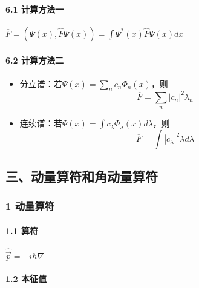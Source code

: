 \documentclass[UTF8,twocolumn]{ctexart}
\providecommand{\tightlist}{%
  \setlength{\itemsep}{0pt}\setlength{\parskip}{0pt}}
\let\oldparagraph\paragraph
\renewcommand{\paragraph}[1]{\oldparagraph{#1}\mbox{}}
\begin{document}
\hypertarget{ux8ba1ux7b97ux65b9ux6cd5ux4e00}{%
\paragraph{ 6.1 计算方法一}\label{ux8ba1ux7b97ux65b9ux6cd5ux4e00}}

\begin{center}
\(\overline{F}=(\Psi(x),\hat{F}\Psi(x))=\int\Psi^*(x)\hat{F}\Psi(x)dx\)
\end{center}

\hypertarget{ux8ba1ux7b97ux65b9ux6cd5ux4e8c}{%
\paragraph{ 6.2 计算方法二}\label{ux8ba1ux7b97ux65b9ux6cd5ux4e8c}}

\begin{itemize}
\tightlist
\item
  分立谱：若\(\Psi(x)=\sum_nc_n\Phi_n(x)\)，则
  \[\overline{F}=\sum_n|c_n|^2\lambda_n\]
\item
  连续谱：若\(\Psi(x)=\int c_{\lambda}\Phi_{\lambda}(x)d\lambda\)，则
  \[\overline{F}=\int|c_{\lambda}|^2\lambda d\lambda\]
\end{itemize}

\hypertarget{ux4e09ux52a8ux91cfux7b97ux7b26ux548cux89d2ux52a8ux91cfux7b97ux7b26}{%
\subsection{三、动量算符和角动量算符}\label{ux4e09ux52a8ux91cfux7b97ux7b26ux548cux89d2ux52a8ux91cfux7b97ux7b26}}

\hypertarget{ux52a8ux91cfux7b97ux7b26}{%
\subsubsection{1 动量算符}\label{ux52a8ux91cfux7b97ux7b26}}

\hypertarget{ux7b97ux7b26}{%
\paragraph{ 1.1 算符}\label{ux7b97ux7b26}}

\begin{center}
\(\hat{\vec{p}}=-i\hbar\nabla\)
\end{center}

\hypertarget{ux672cux5f81ux503c-1}{%
\paragraph{ 1.2 本征值}\label{ux672cux5f81ux503c-1}}
\end{document}
